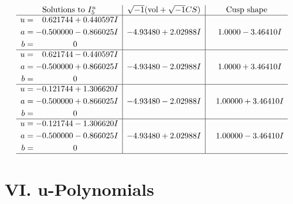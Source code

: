 \documentclass[1p]{elsarticle_modified}
\theoremstyle{definition}
\newcommand{\I}{\sqrt{-1}}
\begin{document}
$$\begin{array}{c|c|c}  
\text{Solutions to }I^u_{5}& \I (\text{vol} + \sqrt{-1}CS) & \text{Cusp shape}\\
 \hline 
\begin{aligned}
u &= \phantom{-}0.621744 + 0.440597 I \\
a &= -0.500000 - 0.866025 I \\
b &= \phantom{-0.000000 } 0\end{aligned}
 & -4.93480 + 2.02988 I & \phantom{-}1.0000 - 3.46410 I \\ \hline\begin{aligned}
u &= \phantom{-}0.621744 - 0.440597 I \\
a &= -0.500000 + 0.866025 I \\
b &= \phantom{-0.000000 } 0\end{aligned}
 & -4.93480 - 2.02988 I & \phantom{-}1.0000 + 3.46410 I \\ \hline\begin{aligned}
u &= -0.121744 + 1.306620 I \\
a &= -0.500000 + 0.866025 I \\
b &= \phantom{-0.000000 } 0\end{aligned}
 & -4.93480 - 2.02988 I & \phantom{-}1.00000 + 3.46410 I \\ \hline\begin{aligned}
u &= -0.121744 - 1.306620 I \\
a &= -0.500000 - 0.866025 I \\
b &= \phantom{-0.000000 } 0\end{aligned}
 & -4.93480 + 2.02988 I & \phantom{-}1.00000 - 3.46410 I\\
 \hline 
 \end{array}$$\newpage
\newpage\renewcommand{\arraystretch}{1}
\centering \section*{ VI. u-Polynomials}
\end{document}
